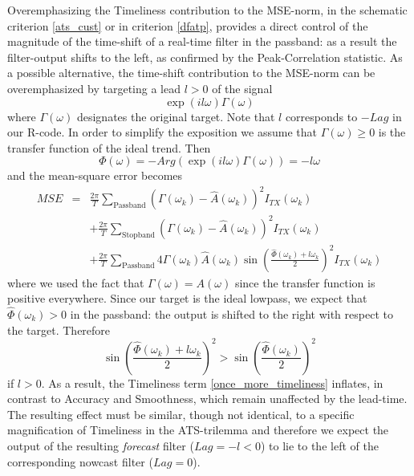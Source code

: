\documentclass[a4paper]{book}
\begin{document}
Overemphasizing the Timeliness contribution to the MSE-norm, in the schematic criterion \ref{ats_cust} or in criterion \ref{dfatp}, provides a direct control of the magnitude of the time-shift of a real-time filter in the passband: as a result the filter-output shifts to the left, as confirmed by the Peak-Correlation statistic. As a possible alternative, the time-shift contribution to the MSE-norm can be overemphasized by targeting a lead $l>0$ of the signal 
\begin{equation}\label{forecast_targ_spe}
\exp(i l \omega)\Gamma(\omega)
\end{equation}
where $\Gamma(\omega)$ designates the original target. Note that $l$ corresponds to $-Lag$ in our R-code. In order to simplify the exposition we assume that $\Gamma(\omega)\geq 0$ is the transfer function of the ideal trend. Then 
\[
\Phi(\omega)=-Arg(\exp(i l \omega)\Gamma(\omega))=-l\omega
\]
and the mean-square error becomes
\begin{eqnarray}
MSE&=&\frac{2\pi}{ T} \sum_{\textrm{Passband}} (\Gamma(\omega_k)-\hat{A}(\omega_k))^2 I_{TX}(\omega_k)\nonumber\\
&&+\frac{2\pi}{ T} \sum_{\textrm{Stopband}} (\Gamma(\omega_k)-\hat{A}(\omega_k))^2 I_{TX}(\omega_k)\nonumber\\
&&+\frac{2\pi}{ T}  \sum_{\textrm{Passband}} 4\Gamma(\omega_k)\hat{A}(\omega_k)\sin\left(\frac{\hat{\Phi}(\omega_k)+l\omega_k}{2}\right)^2 I_{TX}(\omega_k) \label{once_more_timeliness}
\end{eqnarray}
where we used the fact that $\Gamma(\omega)=A(\omega)$ since the transfer function is positive everywhere.
Since our target is the ideal lowpass, we expect that $\hat{\Phi}(\omega_k)>0$ in the passband: the output is shifted to the right with respect to the target. Therefore 
\[
\sin\left(\frac{\hat{\Phi}(\omega_k)+l\omega_k}{2}\right)^2>\sin\left(\frac{\hat{\Phi}(\omega_k)}{2}\right)^2
\]
if $l>0$. As a result, the Timeliness term \ref{once_more_timeliness} inflates, in contrast to Accuracy and Smoothness, which remain unaffected by the lead-time. The resulting effect must be similar, though not identical, to a specific magnification of Timeliness in the ATS-trilemma and therefore we expect the output of the resulting \emph{forecast} filter ($Lag=-l<0$) to lie to the left of the corresponding nowcast filter ($Lag=0$).\\
\end{document}
